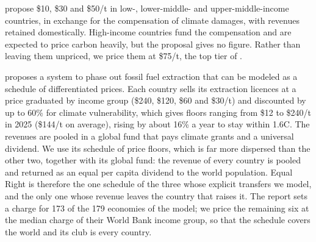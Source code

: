 \documentclass[12pt,english]{article}
\theoremstyle{remark}
\begin{document}
\citet{banerjee_grand_2025} propose \$10, \$30 and \$50/t in low-, lower-middle- and upper-middle-income countries, in exchange for the compensation of climate damages, with revenues retained domestically. High-income countries fund the compensation and are expected to price carbon heavily, but the proposal gives no figure. Rather than leaving them unpriced, we price them at \$75/t, the top tier of \citet{wolfram_building_2025}.

\citet{equal_right_climate_2023} proposes a system to phase out fossil fuel extraction that can be modeled as a schedule of differentiated prices.  
Each country sells its extraction licences at a price graduated by income group (\$240, \$120, \$60 and \$30/t) and discounted by up to 60\% for climate vulnerability, which gives floors ranging from \$12 to \$240/t in 2025 (\$144/t on average), rising by about 16\% a year to stay within 1.6\textdegree C. 
The revenues are pooled in a global fund that pays climate grants and a universal dividend. We use its schedule of price floors, which is far more dispersed than the other two, together with its global fund: the revenue of every country is pooled and returned as an equal per capita dividend to the world population. Equal Right is therefore the one schedule of the three whose explicit transfers we model, and the only one whose revenue leaves the country that raises it. The report sets a charge for 173 of the 179 economies of the model; we price the remaining six at the median charge of their World Bank income group, so that the schedule covers the world and its club is every country. %
\end{document}
